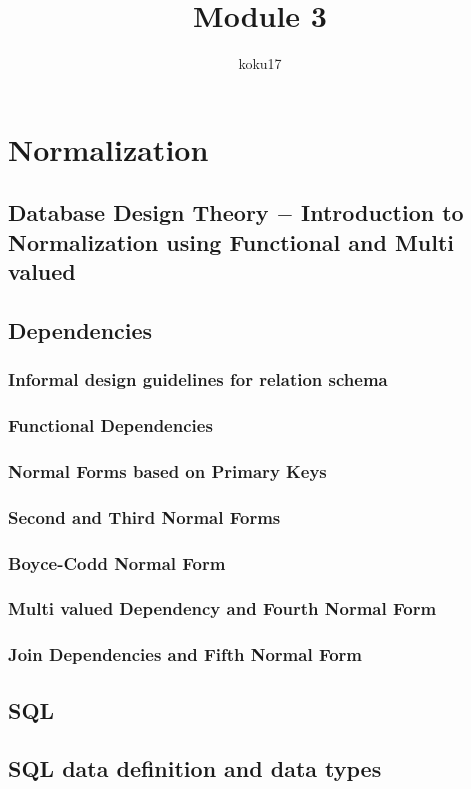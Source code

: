 \documentclass{article}
\title{Module 3}
\author{koku17}
\begin{document}
	\maketitle \thispagestyle{empty} \newpage
	\tableofcontents \thispagestyle{empty} \newpage
	\section{Normalization}
	\subsection{Database Design Theory $-$ Introduction to Normalization using Functional and Multi valued}
	\subsection{Dependencies}
	\subsubsection{Informal design guidelines for relation schema}
	\subsubsection{Functional Dependencies}
	\subsubsection{Normal Forms based on Primary Keys}
	\subsubsection{Second and Third Normal Forms}
	\subsubsection{Boyce-Codd Normal Form}
	\subsubsection{Multi valued Dependency and Fourth Normal Form}
	\subsubsection{Join Dependencies and Fifth Normal Form}

	\subsection{SQL}
	\subsection{SQL data definition and data types}
\end{document}
